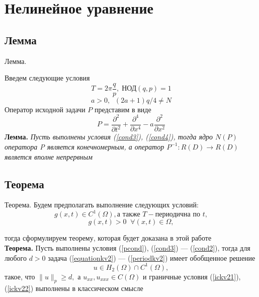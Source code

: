 \documentclass[ignorenonframetext,unicode,handout, 9pt]{beamer}
\numberwithin{equation}{section}
\begin{document}

\section{Нелинейное уравнение}
\subsection{Лемма}

\begin{frame}{Лемма.}

Введем следующие условия
\begin{equation}\label{cond3}
   T = 2\pi\frac{q}{p}, \; \text{НОД}(q, p) = 1
\end{equation}
\begin{equation}\label{cond4}
   a > 0, \;\; (2a + 1)q/4 \ne N
\end{equation}
Оператор исходной задачи $P$ представим в виде
\begin{equation}
  P = \frac{\partial^2}{\partial t^2} + \frac{\partial^4}{\partial x^4} - a \frac{\partial^2}{\partial x^2}
\end{equation}
\textbf{Лемма. }\textit{Пусть выполнены условия (\ref{cond3}), (\ref{cond4}), тогда ядро $N(P)$ оператора P является конечномерным, а оператор $P^{-1}: R(D) \rightarrow R(D)$ является вполне непрервным}\\

\end{frame}


\subsection{Теорема}

\begin{frame}{Теорема.}
Будем предполагать выполнение следующих условий:
\begin{equation}\label{cond1}
  g(x, t) \in C^1(\Omega), \text{а также } T-\text{периодична по } t,
\end{equation}
\begin{equation}\label{cond2}
  g(x, t) > 0 \;\; \forall(x, t) \in \Omega, 
\end{equation}

тогда сформулируем теорему, которая будет доказана в этой работе
\\
\textbf{Теорема. } Пусть выполнены условия (\ref{pcond}), (\ref{cond3}) --- (\ref{cond2}), тогда для любого $d > 0$ задача (\ref{equationkv2}) --- (\ref{periodkv2}) имеет обобщенное решение \\
\begin{equation}
  u \in H_2(\Omega) \cap C^1(\Omega),
\end{equation}
такое, что $\|u\|_p \geqslant d,$ а $u_{xx}, u_{xxx} \in C(\Omega)$ и граничные условия (\ref{ickv21}), (\ref{ickv22}) выполнены в классическом смысле
\end{frame}
\end{document}
